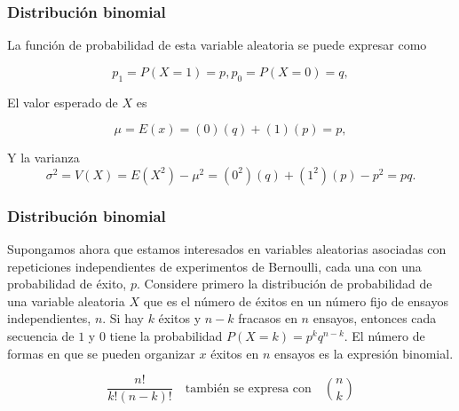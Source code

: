 \documentclass[spanish]{beamer}
\begin{document}


\begin{frame}
\frametitle{Distribución binomial}
 
La función de probabilidad de esta variable aleatoria se puede expresar como

$$
p_{1} = P(X = 1) = p, p_{0} = P(X = 0) = q,
$$

El valor esperado de $X$ es 

$$
\mu = E(x)= (0)(q)+ (1)(p)=p,
$$

Y la varianza 
$$             
\sigma^2 = V(X) = E(X^2 ) - \mu^2 = (0^2)(q) + (1^2)(p) - p^2 = pq.                                               $$
       

\end{frame}




\begin{frame}
\frametitle{Distribución binomial}
Supongamos ahora que estamos interesados en variables aleatorias asociadas con repeticiones independientes de experimentos de Bernoulli, cada una con una probabilidad de éxito, $p$. Considere primero la distribución de probabilidad de una variable aleatoria $X$ que es el número de éxitos en un número fijo de ensayos independientes, $n$. Si hay $k$ éxitos y $n - k$ fracasos en $n$ ensayos, entonces cada secuencia de $1$ y $0$ tiene la probabilidad $P (X = k) = p^k q^{n - k}$. El número de formas en que se pueden organizar $x$ éxitos en $n$ ensayos es la expresión binomial. 

$$
\frac{n!}{k!(n-k)!} \quad \text{también se expresa con} \quad \binom{n}{k}
$$

\end{frame}


\end{document}

